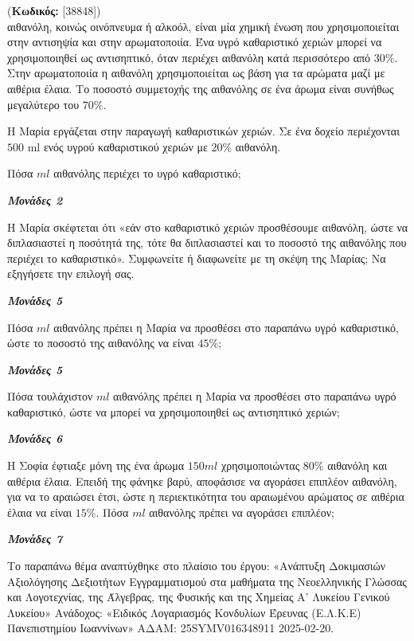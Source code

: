 \documentclass[11pt,a4paper,twoside]{book}
\newcounter{askhsh}[chapter]
\renewcommand{\theaskhsh}{
	\bf{\titlefont{\Large{\thechapter}}.\arabic{askhsh}}
}
\newcommand{\Askhsh}[2]{\refstepcounter{askhsh}{\titlefont{Άσκηση\theaskhsh} - \textcolor{maincolor}{ΘΕΜΑ #2}} (\small{\textbf{Κωδικός:} #1})\\}{}
\newcommand{\monades}[1]{
\hspace*{\fill}
\textbf{\textit{\textcolor{maincolor}{Μονάδες #1}}}}
\begin{document}
\Askhsh{[38848]}
Η αιθανόλη, κοινώς οινόπνευμα ή αλκοόλ, είναι μία χημική ένωση που χρησιμοποιείται στην αντισηψία και στην αρωματοποιία. Ένα υγρό καθαριστικό χεριών μπορεί να χρησιμοποιηθεί ως αντισηπτικό, όταν περιέχει αιθανόλη κατά περισσότερο από $30\%$. Στην αρωματοποιία η αιθανόλη χρησιμοποιείται ως βάση για τα αρώματα μαζί με αιθέρια έλαια. Το ποσοστό συμμετοχής της αιθανόλης σε ένα άρωμα είναι συνήθως μεγαλύτερο του $70\%$.

\begin{alist}
\item Η Μαρία εργάζεται στην παραγωγή καθαριστικών χεριών. Σε ένα δοχείο περιέχονται $500$ ml ενός υγρού καθαριστικού χεριών με $20\%$ αιθανόλη.

\begin{rlist}
\item Πόσα $ml$ αιθανόλης περιέχει το υγρό καθαριστικό;
\monades{2}
\item Η Μαρία σκέφτεται ότι «εάν στο καθαριστικό χεριών προσθέσουμε αιθανόλη, ώστε να διπλασιαστεί η ποσότητά της, τότε θα διπλασιαστεί και το ποσοστό της αιθανόλης που περιέχει το καθαριστικό». Συμφωνείτε ή διαφωνείτε με τη σκέψη της Μαρίας; Να εξηγήσετε την επιλογή σας.
\monades{5}
\item Πόσα $ml$ αιθανόλης πρέπει η Μαρία να προσθέσει στο παραπάνω υγρό καθαριστικό, ώστε το ποσοστό της αιθανόλης να είναι $45\%$;
\monades{5}
\item Πόσα τουλάχιστον $ml$ αιθανόλης πρέπει η Μαρία να προσθέσει στο παραπάνω υγρό καθαριστικό, ώστε να μπορεί να χρησιμοποιηθεί ως αντισηπτικό χεριών;
\monades{6}
\end{rlist}
\item Η Σοφία έφτιαξε μόνη της ένα άρωμα $150ml$ χρησιμοποιώντας $80\%$ αιθανόλη και αιθέρια έλαια. Επειδή της φάνηκε βαρύ, αποφάσισε να αγοράσει επιπλέον αιθανόλη, για να το αραιώσει έτσι, ώστε η περιεκτικότητα του αραιωμένου αρώματος σε αιθέρια έλαια να είναι $15\%$. Πόσα $ml$ αιθανόλης πρέπει να αγοράσει επιπλέον;
\monades{7}

{\footnotesize Το παραπάνω θέμα αναπτύχθηκε στο πλαίσιο του έργου: «Ανάπτυξη Δοκιμασιών Αξιολόγησης Δεξιοτήτων Εγγραμματισμού στα μαθήματα της Νεοελληνικής Γλώσσας και Λογοτεχνίας, της Άλγεβρας, της Φυσικής και της Χημείας Α' Λυκείου Γενικού Λυκείου» Ανάδοχος: «Ειδικός Λογαριασμός Κονδυλίων Έρευνας (Ε.Λ.Κ.Ε) Πανεπιστημίου Ιωαννίνων» ΑΔΑΜ: 25SYMV016348911 2025-02-20.}
\end{alist}

\vspace{4mm}
\end{document}
